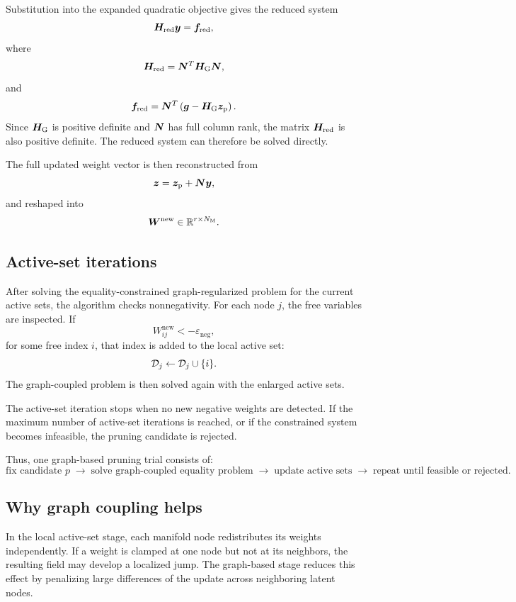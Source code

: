 \documentclass[11pt,a4paper]{article}
\begin{document}
Substitution into the expanded quadratic objective gives the reduced system
\[
        \bm H_{\mathrm{red}} \bm y = \bm f_{\mathrm{red}},
        \label{eq:reduced_nullspace_system}
\]
where
\[
        \bm H_{\mathrm{red}} = \bm N^T\bm H_{\mathrm{G}}\bm N,
\]
and
\[
        \bm f_{\mathrm{red}} =
        \bm N^T
        \left(
        \bm g-\bm H_{\mathrm{G}}\bm z_{\mathrm{p}}
        \right).
\]
Since $\bm H_{\mathrm{G}}$ is positive definite and $\bm N$ has full column rank, the
matrix $\bm H_{\mathrm{red}}$ is also positive definite. The reduced system can therefore be
solved directly.

The full updated weight vector is then reconstructed from
\[
        \bm z = \bm z_{\mathrm{p}}+\bm N\bm y,
\]
and reshaped into
\[
        \bm W^{\mathrm{new}}\in\mathbb{R}^{r\times N_{\mathrm{M}}}.
\]

\subsection{Active-set iterations}

After solving the equality-constrained graph-regularized problem for the
current active sets, the algorithm checks nonnegativity. For each node $j$, the
free variables are inspected. If
\[
        W^{\mathrm{new}}_{ij}<-\varepsilon_{\mathrm{neg}},
\]
for some free index $i$, that index is added to the local active set:
\[
        \mathcal{D}_j \gets \mathcal{D}_j\cup\{i\}.
\]
The graph-coupled problem is then solved again with the enlarged active sets.

The active-set iteration stops when no new negative weights are detected. If the
maximum number of active-set iterations is reached, or if the constrained system
becomes infeasible, the pruning candidate is rejected.

Thus, one graph-based pruning trial consists of:
\[
        \text{fix candidate }p
        \;\longrightarrow\;
        \text{solve graph-coupled equality problem}
        \;\longrightarrow\;
        \text{update active sets}
        \;\longrightarrow\;
        \text{repeat until feasible or rejected}.
\]

\subsection{Why graph coupling helps}

In the local active-set stage, each manifold node redistributes its weights
independently. If a weight is clamped at one node but not at its neighbors, the
resulting field may develop a localized jump. The graph-based stage reduces this
effect by penalizing large differences of the update across neighboring latent
nodes.
\end{document}
